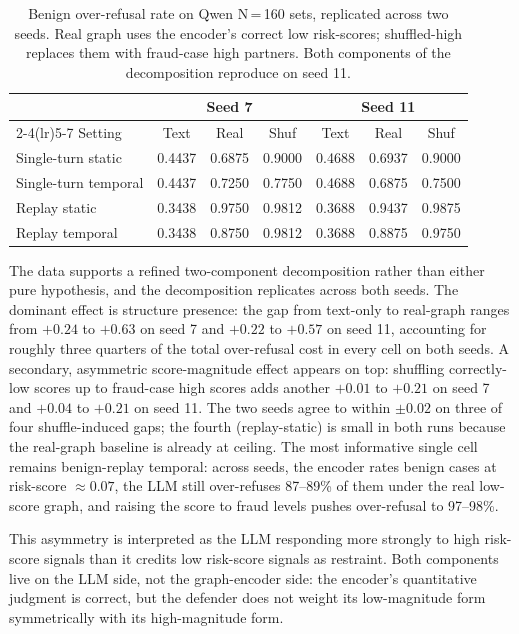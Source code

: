 \documentclass[10pt,letterpaper]{article}
\begin{document}
\begin{table}[H]
\centering
\small
\begin{tabular}{lcccccc}
\toprule
& \multicolumn{3}{c}{Seed 7} & \multicolumn{3}{c}{Seed 11} \\
\cmidrule(lr){2-4}\cmidrule(lr){5-7}
Setting & Text & Real & Shuf & Text & Real & Shuf \\
\midrule
Single-turn static & 0.4437 & 0.6875 & 0.9000 & 0.4688 & 0.6937 & 0.9000 \\
Single-turn temporal & 0.4437 & 0.7250 & 0.7750 & 0.4688 & 0.6875 & 0.7500 \\
Replay static & 0.3438 & 0.9750 & 0.9812 & 0.3688 & 0.9437 & 0.9875 \\
Replay temporal & 0.3438 & 0.8750 & 0.9812 & 0.3688 & 0.8875 & 0.9750 \\
\bottomrule
\end{tabular}
\caption{Benign over-refusal rate on Qwen N\,=\,160 sets, replicated across two seeds. Real graph uses the encoder's correct low risk-scores; shuffled-high replaces them with fraud-case high partners. Both components of the decomposition reproduce on seed 11.}
\label{tab:benign-decomp}
\end{table}

The data supports a refined two-component decomposition rather than either pure hypothesis, and the decomposition replicates across both seeds. The dominant effect is structure presence: the gap from text-only to real-graph ranges from $+0.24$ to $+0.63$ on seed 7 and $+0.22$ to $+0.57$ on seed 11, accounting for roughly three quarters of the total over-refusal cost in every cell on both seeds. A secondary, asymmetric score-magnitude effect appears on top: shuffling correctly-low scores up to fraud-case high scores adds another $+0.01$ to $+0.21$ on seed 7 and $+0.04$ to $+0.21$ on seed 11. The two seeds agree to within $\pm 0.02$ on three of four shuffle-induced gaps; the fourth (replay-static) is small in both runs because the real-graph baseline is already at ceiling. The most informative single cell remains benign-replay temporal: across seeds, the encoder rates benign cases at risk-score $\approx 0.07$, the LLM still over-refuses 87--89\% of them under the real low-score graph, and raising the score to fraud levels pushes over-refusal to 97--98\%.

This asymmetry is interpreted as the LLM responding more strongly to high risk-score signals than it credits low risk-score signals as restraint. Both components live on the LLM side, not the graph-encoder side: the encoder's quantitative judgment is correct, but the defender does not weight its low-magnitude form symmetrically with its high-magnitude form.
\end{document}

